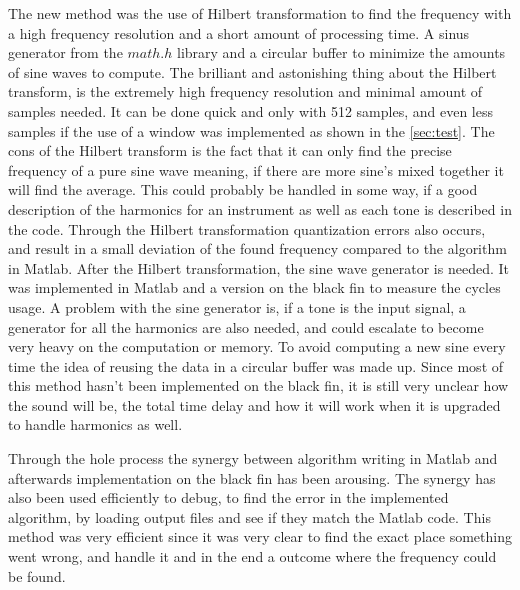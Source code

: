 The new method was the use of Hilbert transformation to find the frequency with a high frequency resolution and a short amount of processing time.
A sinus generator from the $math.h$ library and a circular buffer to minimize the amounts of sine waves to compute.
The brilliant and astonishing thing about the Hilbert transform, is the extremely high frequency resolution and minimal amount of samples needed.
It can be done quick and only with 512 samples, and even less samples if the use of a window was implemented as shown in the \cref{sec:test}.
The cons of the Hilbert transform is the fact that it can only find the precise frequency of a pure sine wave meaning, if there are more sine's mixed together it will find the average.
This could probably be handled in some way, if a good description of the harmonics for an instrument as well as each tone is described in the code.
Through the Hilbert transformation quantization errors also occurs, and result in a small deviation of the found frequency compared to the algorithm in Matlab. 
After the Hilbert transformation, the sine wave generator is needed.
It was implemented in Matlab and a version on the black fin to measure the cycles usage.  
A problem with the sine generator is, if a tone is the input signal, a generator for all the harmonics are also needed, and could escalate to become very heavy on the computation or memory.
To avoid computing a new sine every time the idea of reusing the data in a circular buffer was made up. 
Since most of this method hasn't been implemented on the black fin, it is still very unclear how the sound will be, the total time delay and how it will work when it is upgraded to handle harmonics as well.

Through the hole process the synergy between algorithm writing in Matlab and afterwards implementation on the black fin has been arousing.
The synergy has also been used efficiently to debug, to find the error in the implemented algorithm, by loading output files and see if they match the Matlab code.
This method was very efficient since it was very clear to find the exact place something went wrong, and handle it and in the end a outcome where the frequency could be found.   

